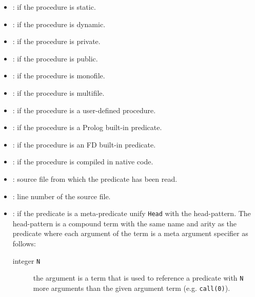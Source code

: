 \begin{itemize}

\item {}: if the procedure is static.

\item {}: if the procedure is dynamic.

\item {}: if the procedure is private.

\item {}: if the procedure is public.

\item {}: if the procedure is monofile.

\item {}: if the procedure is multifile.

\item {}: if the procedure is a user-defined procedure.

\item {}: if the procedure is a Prolog built-in predicate.

\item {}: if the procedure is an FD built-in predicate.

\item {}: if the procedure is compiled in native code.

\item {}: source file from which the
predicate has been read.

\item {}: line number of the source
file.

\item {}: if the predicate is a
  meta-predicate unify \texttt{Head} with the head-pattern. The head-pattern
  is a compound term with the same name and arity as the predicate where each
  argument of the term is a meta argument specifier as follows:

\BL

\begin{description}

\item [integer \texttt{N}] the argument is a term that is used to reference a
  predicate with \texttt{N} more arguments than the given argument term (e.g. \texttt{call(0)}).


\end{description}
\end{itemize}
